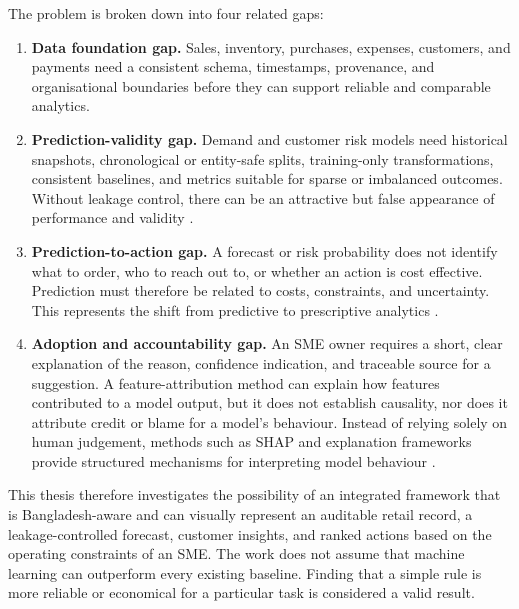 \documentclass[a4paper,11pt,oneside]{book}
\theoremstyle{plain}
\theoremstyle{definition}
\theoremstyle{remark}
\begin{document}
The problem is broken down into four related gaps:

\begin{enumerate}[label=G\arabic*.]

\item \textbf{Data foundation gap.} Sales, inventory, purchases, expenses, customers, and payments need a consistent schema, timestamps, provenance, and organisational boundaries before they can support reliable and comparable analytics.

\item \textbf{Prediction-validity gap.} Demand and customer risk models need historical snapshots, chronological or entity-safe splits, training-only transformations, consistent baselines, and metrics suitable for sparse or imbalanced outcomes. Without leakage control, there can be an attractive but false appearance of performance and validity \cite{kaufman2012leakage}.

\item \textbf{Prediction-to-action gap.} A forecast or risk probability does not identify what to order, who to reach out to, or whether an action is cost effective. Prediction must therefore be related to costs, constraints, and uncertainty. This represents the shift from predictive to prescriptive analytics \cite{bertsimas2020prescriptive}.

\item \textbf{Adoption and accountability gap.} An SME owner requires a short, clear explanation of the reason, confidence indication, and traceable source for a suggestion. A feature-attribution method can explain how features contributed to a model output, but it does not establish causality, nor does it attribute credit or blame for a model's behaviour. Instead of relying solely on human judgement, methods such as SHAP and explanation frameworks provide structured mechanisms for interpreting model behaviour \cite{lundberg2017shap,miller2019explanation}.

\end{enumerate}

This thesis therefore investigates the possibility of an integrated framework that is Bangladesh-aware and can visually represent an auditable retail record, a leakage-controlled forecast, customer insights, and ranked actions based on the operating constraints of an SME. The work does not assume that machine learning can outperform every existing baseline. Finding that a simple rule is more reliable or economical for a particular task is considered a valid result.
\end{document}
